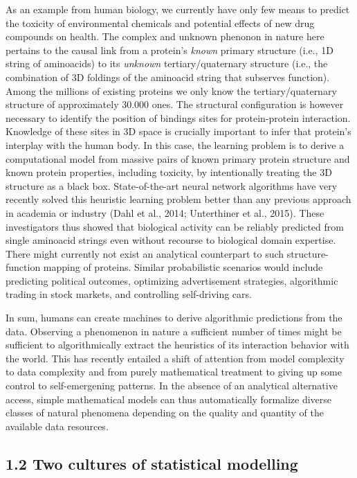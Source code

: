 \documentclass[authoryear,review,3p]{elsarticle}
\begin{document}
As an example from human biology,
we currently have only few means to predict the
toxicity of environmental chemicals and
potential effects of new drug compounds on health.
%
The complex and unknown phenonon in nature here pertains
to the causal link from
a protein's \textit{known} primary structure
(i.e., 1D string of aminoacids)
to
its \textit{unknown} tertiary/quaternary structure
(i.e., the combination of 3D foldings
of the aminoacid string that subserves function).
%
Among the millions of existing proteins
we only know the tertiary/quaternary structure of
approximately 30.000 ones.
The structural configuration is however necessary to identify the position of
bindings sites for protein-protein interaction.
Knowledge of these sites in 3D space is crucially important
to infer that protein's interplay with the human body.
%
In this case,
the learning problem is to
derive a computational model from
massive pairs of known primary protein structure and
known protein properties, including toxicity,
by intentionally treating the 3D structure
as a black box.
%
State-of-the-art neural network algorithms
have very recently solved this heuristic learning problem
better than any previous approach in academia or industry
(Dahl et al., 2014; Unterthiner et al., 2015).
These investigators thus showed that biological activity
can be reliably predicted from single aminoacid strings
even without recourse to biological domain expertise.
%
There might currently not exist
an analytical counterpart to such
structure-function mapping of proteins.
%
%
Similar probabilistic scenarios would include predicting
political outcomes,
optimizing advertisement strategies,
algorithmic trading in stock markets, and
controlling self-driving cars.


In sum,
humans can create machines to derive
algorithmic predictions from the data.
Observing a phenomenon in nature a sufficient number of times
might be sufficient to
algorithmically extract
the heuristics of its interaction behavior with the world.
This has recently entailed a shift
of attention
from model complexity to data complexity
and
from purely mathematical treatment to giving up some control to self-emergening patterns.
In the absence of an analytical alternative access,
simple mathematical models can thus automatically
formalize diverse classes of natural phenomena
depending on the quality and quantity of
the available data resources.



\subsection*{1.2 Two cultures of statistical modelling}
\end{document}
